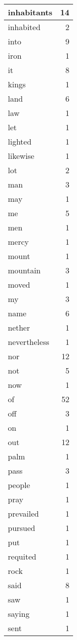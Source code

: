 \begin{center}
\begin{longtable}{l|r}
inhabitants & 14 \\ \hline
inhabited & 2 \\ \hline
into & 9 \\ \hline
iron & 1 \\ \hline
it & 8 \\ \hline
kings & 1 \\ \hline
land & 6 \\ \hline
law & 1 \\ \hline
let & 1 \\ \hline
lighted & 1 \\ \hline
likewise & 1 \\ \hline
lot & 2 \\ \hline
man & 3 \\ \hline
may & 1 \\ \hline
me & 5 \\ \hline
men & 1 \\ \hline
mercy & 1 \\ \hline
mount & 1 \\ \hline
mountain & 3 \\ \hline
moved & 1 \\ \hline
my & 3 \\ \hline
name & 6 \\ \hline
nether & 1 \\ \hline
nevertheless & 1 \\ \hline
nor & 12 \\ \hline
not & 5 \\ \hline
now & 1 \\ \hline
of & 52 \\ \hline
off & 3 \\ \hline
on & 1 \\ \hline
out & 12 \\ \hline
palm & 1 \\ \hline
pass & 3 \\ \hline
people & 1 \\ \hline
pray & 1 \\ \hline
prevailed & 1 \\ \hline
pursued & 1 \\ \hline
put & 1 \\ \hline
requited & 1 \\ \hline
rock & 1 \\ \hline
said & 8 \\ \hline
saw & 1 \\ \hline
saying & 1 \\ \hline
sent & 1 \\ \hline

\end{longtable}
\end{center}

